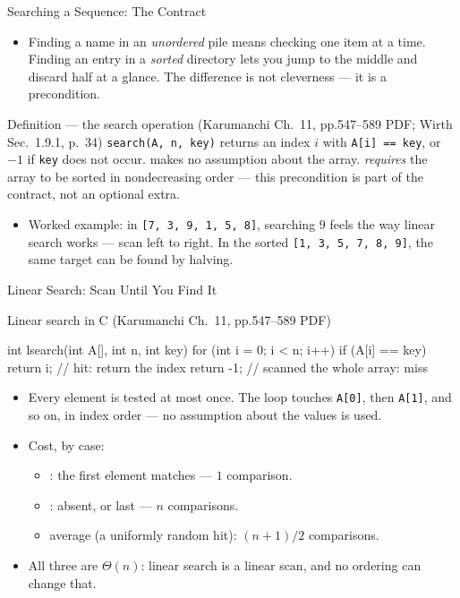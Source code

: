 \documentclass[aspectratio=169]{beamer}
\begin{document}
\begin{frame}{Searching a Sequence: The Contract}
  \begin{itemize}
    \item Finding a name in an \emph{unordered} pile means checking one item
      at a time. Finding an entry in a \emph{sorted} directory lets you jump
      to the middle and discard half at a glance. The difference is not
      cleverness --- it is a precondition.
  \end{itemize}
  \begin{block}{Definition --- the search operation (Karumanchi Ch.~11,
    pp.547--589 PDF; Wirth Sec.~1.9.1, p.~34)
    \cite{Karumanchi2017_data_structures_algorithms_made_easy,Wirth2004_algorithms_data_structures}}
    \texttt{search(A, n, key)} returns an index $i$ with \texttt{A[i] ==
    key}, or $-1$ if \texttt{key} does not occur.  makes no
    assumption about the array.  \emph{requires} the array
    to be sorted in nondecreasing order --- this precondition is part of the
    contract, not an optional extra.
  \end{block}
  \begin{itemize}
    \item Worked example: in \texttt{[7, 3, 9, 1, 5, 8]}, searching $9$ feels
      the way linear search works --- scan left to right. In the sorted
      \texttt{[1, 3, 5, 7, 8, 9]}, the same target can be found by halving.
  \end{itemize}
\end{frame}

\begin{frame}[fragile]{Linear Search: Scan Until You Find It}
  \footnotesize
  \begin{block}{Linear search in C (Karumanchi Ch.~11, pp.547--589 PDF)}
\begin{semiverbatim}
int lsearch(int A[], int n, int key) {
  for (int i = 0; i < n; i++)
    if (A[i] == key) return i;   // hit: return the index
  return -1;                     // scanned the whole array: miss
}
\end{semiverbatim}
  \end{block}
  \begin{itemize}
    \item Every element is tested at most once. The loop touches
      \texttt{A[0]}, then \texttt{A[1]}, and so on, in index order --- no
      assumption about the values is used.
    \item Cost, by case:
      \begin{itemize}
        \item {}: the first element matches --- $1$ comparison.
        \item {}: absent, or last --- $n$ comparisons.
        \item average (a uniformly random hit): $(n+1)/2$ comparisons.
      \end{itemize}
    \item All three are $\Theta(n)$: linear search is a linear scan, and no
      ordering can change that.
  \end{itemize}
\end{frame}
\end{document}
